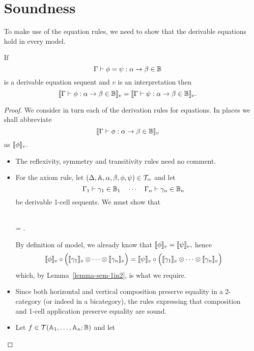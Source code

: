 \documentclass{robinthesisdraft}
\begin{document}
\section{Soundness}
To make use of the equation rules, we need to show that the derivable equations
hold in every model.
\begin{propn}[Soundness]
	If
	\[
		\Gamma\vdash\phi=\psi: \alpha\to\beta \in\mathbb{B}
	\]
	is a derivable equation sequent and $v$ is an interpretation
	then
	\[
		\llbracket \Gamma\vdash\phi: \alpha\to\beta \in\mathbb{B} \rrbracket_{v}
		=
		\llbracket \Gamma\vdash\psi: \alpha\to\beta \in\mathbb{B} \rrbracket_{v}.
	\]
\end{propn}
\begin{proof}
	We consider in turn each of the derivation rules for equations.
	In places we shall abbreviate
	\[
		\semint{\Gamma\proves\phi: \alpha\to\beta\in\CB}
	\]
	as $\semint{\phi}$.
	\begin{itemize}
	\item The reflexivity, symmetry and transitivity rules need no comment.
	\item For the axiom rule, let $(\Delta,\mathbb{A},\alpha,\beta,\phi,\psi)\in{\mathcal{T}}_{=}$ and let
		\[
			\Gamma_{1} \vdash \gamma_{1}\in\mathbb{B}_{1}
			\quad\cdots\quad
			\Gamma_{n} \vdash \gamma_{n}\in\mathbb{B}_{n}
		\]
		be derivable 1-cell sequents. We must show that
		\begin{mmulti}
			\\ =
			.
		\end{mmulti}
		By definition of model, we already know that
		\(
			\semint{\phi}
			=
			\semint{\psi},
		\)
		hence
		\[
			\semint{\phi}
				\o
				\Bigl(
					\semint{\gamma_{1}}
					\tn\cdots\tn
					\semint{\gamma_{n}}
				\Bigr)
			=
			\semint{\psi}
				\o
				\Bigl(
					\semint{\gamma_{1}}
					\tn\cdots\tn
					\semint{\gamma_{n}}
				\Bigr)
		\]
		which, by Lemma~\ref{lemma-sem-1in2}, is what we require.
	\item Since both horizontal and vertical composition preserve equality
		in a 2-category (or indeed in a bicategory), the rules expressing
		that composition and 1-cell application preserve equality are sound.
	\item Let $f\in{\mathcal{T}}(\mathbb{A}_{1},\dots,\mathbb{A}_{n};\mathbb{B})$ and let
		\[
\]
\end{itemize}
\end{proof}
\end{document}
